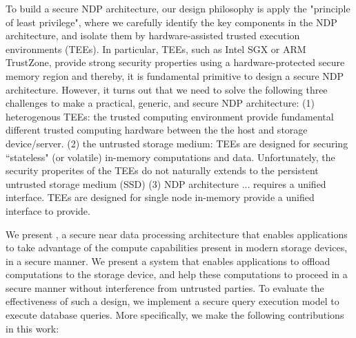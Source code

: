 To build a secure NDP architecture, our design philosophy is apply the "principle of least privilege", where we carefully identify the key components in the NDP architecture, and isolate them by hardware-assisted trusted execution environments (TEEs). In particular, TEEs, such as Intel SGX or ARM
TrustZone, provide strong security properties using a hardware-protected secure memory region and thereby, it is fundamental primitive to design a secure NDP architecture. However, it turns out that we need to solve the following three challenges to make a practical, generic, and secure NDP architecture:
(1) heterogenous TEEs: the trusted computing environment provide fundamental different trusted computing hardware between the the host and storage device/server.
(2) the untrusted storage medium: TEEs are designed for securing “stateless" (or volatile) in-memory computations and data. Unfortunately, the security properites of the TEEs do not naturally extends to the persistent untrusted storage medium (SSD) 
(3) NDP architecture ... requires a unified interface. TEEs are designed for single node in-memory provide a unified interface to provide. %



We present \project, a secure near data processing architecture that enables applications to take advantage of the compute capabilities present in modern storage devices, in a secure manner.
We present a system that enables applications to offload computations to the storage device, and help these computations to proceed in a secure manner without interference from untrusted parties. To evaluate the effectiveness of such a design, we implement a secure query execution model to execute database queries. More specifically, we make the following contributions in this work:

